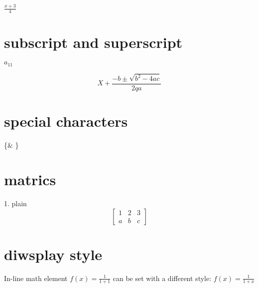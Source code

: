\documentclass[12pt]{book}
\begin{document}
$\frac{x+3}{4}$

\section{subscript and superscript}

$ a_{11} $

$$ X + \frac{-b \pm \sqrt{b^2-4ac}}{2qa} $$

\section{special characters}

\{\& \}

\section{matrics}

1. plain\\

$$
\begin{bmatrix}
1 & 2 & 3\\
a & b & c
\end{bmatrix}
$$

\section{diwsplay style}

In-line math element $f(x)=\frac{1}{1+1}$ can be set with a different style: $
f(x)=\displaystyle\frac{1}{1+x}$
\end{document}
